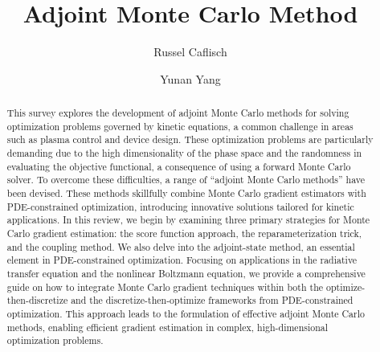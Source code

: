 \documentclass[12pt]{amsart}
\begin{document}
\title{Adjoint Monte Carlo Method}


\author{Russel  Caflisch}
\address{Courant Institute of Mathematical Sciences, New York University, New York, NY 10012.}

\author{Yunan Yang}
\address{Department of Mathematics, Cornell University, Ithaca, NY 14853.}


\begin{abstract} 
This survey explores the development of adjoint Monte Carlo methods for solving optimization problems governed by kinetic equations, a common challenge in areas such as plasma control and device design. These optimization problems are particularly demanding due to the high dimensionality of the phase space and the randomness in evaluating the objective functional, a consequence of using a forward Monte Carlo solver. To overcome these difficulties, a range of ``adjoint Monte Carlo methods'' have been devised. These methods skillfully combine Monte Carlo gradient estimators with PDE-constrained optimization, introducing innovative solutions tailored for kinetic applications. In this review, we begin by examining three primary strategies for Monte Carlo gradient estimation: the score function approach, the reparameterization trick, and the coupling method. We also delve into the adjoint-state method, an essential element in PDE-constrained optimization. Focusing on applications in the radiative transfer equation and the nonlinear Boltzmann equation, we provide a comprehensive guide on how to integrate Monte Carlo gradient techniques within both the optimize-then-discretize and the discretize-then-optimize frameworks from PDE-constrained optimization. This approach leads to the formulation of effective adjoint Monte Carlo methods, enabling efficient gradient estimation in complex, high-dimensional optimization problems.
\end{abstract}










\maketitle
\end{document}
